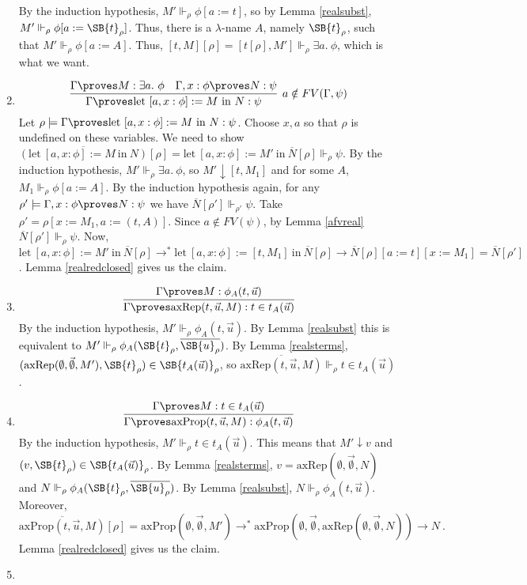 \documentclass{LMCS}
\newcommand{\ov}[1]{\ensuremath{\overline{#1}}}
\newcommand\reals{\ensuremath{\Vdash}}
\newcommand{\p}{\proves}
\newcommand{\g}{\Gamma}
\newcommand{\gp}{\Gamma \proves}
\newcommand{\rrho}{\reals_\rho}
\newcommand{\pl}[1]{\ensuremath{\mathrm{#1}}}
\newcommand{\LET}{\pl{let}}
\newcommand{\IN}{\pl{in}}
\newcommand{\sr}[1]{\ensuremath{\SB{#1}_\rho}}
\begin{document}
\begin{enumerate}[$\bullet$]
\[\]
By the induction hypothesis, $M' \reals_\rho \phi[a:=t]$, so by Lemma
\ref{realsubst}, $M' \reals_\rho \phi[a:=\SB{t}_\rho]$. Thus, there is a $\lambda$-name $A$, namely $\SB{t}_\rho$, such that $M' \reals_\rho \phi[a:=A]$. Thus,
$[t, M][\rho]=[t[\rho], M'] \reals_\rho \exists a.\ \phi$, which is what we want.
\item
\[
\infer[a \notin FV(\Gamma, \psi)]{\gp \LET\ [a, x : \phi] := M\ \IN\ N : \psi}
{\gp M : \exists a.\ \phi & \g, x : \phi \proves N : \psi}
\]
Let $\rho \models \gp \LET\ [a, x : \phi] := M\ \IN\ N : \psi$. Choose $x,
a$ so that $\rho$ is undefined on these variables. 
We need to
show $\ov{(\LET\ [a, x : \phi ] := M\ \IN\ N)}[\rho] = \LET\ [a, x : \phi] := M'\ \IN\ 
\ov{N}[\rho] \rrho \psi$.
By the induction hypothesis, $M' \rrho \exists a.\ \phi$, so $M' \downarrow [t, M_1]$ and
for some $A$, $M_1 \rrho \phi[a:=A]$. By the induction hypothesis again, for any $\rho' \models \g,
x : \phi \p N : \psi$ we have $\ov{N}[\rho'] \reals_{\rho'} \psi$. Take
$\rho' = \rho[x:=M_1, a:=(t, A)]$. Since $a \notin FV(\psi)$, by Lemma
\ref{afvreal} $\ov{N}[\rho'] \rrho \psi $. Now, $\LET\ [a, x : \phi] := M'\
\IN\ \ov{N}[\rho] \to^* \LET\ [a, x : \phi] :=
[t, M_1]\ \IN\ \ov{N}[\rho] \to \ov{N}[\rho][a:=t][x:=M_1] = \ov{N}[\rho']$.
Lemma \ref{realredclosed} gives us the claim.
\item 
\[
\infer{\gp \pl{axRep}(t, \vec{u}, M) : t \in t_A(\vec{u})}{\gp M : \phi_A(t, \vec{u})}
\]
By the induction hypothesis, $M' \reals_\rho \phi_A(t, \vec{u})$. By Lemma \ref{realsubst} 
this is equivalent to $M' \reals_\rho \phi_A(\SB{t}_\rho, \ov{\SB{u}_\rho})$.
By Lemma \ref{realsterms}, $(\pl{axRep}(\emptyset, \vec{\emptyset}, M'), \SB{t}_\rho) \in
\SB{t_A(\vec{u})}_\rho$, so $\ov{\pl{axRep}(t, \vec{u}, M)} \rrho t \in t_A(\vec{u})$. 
\item
\[
\infer{\gp \pl{axProp}(t, \vec{u}, M) : \phi_A(t, \vec{u}) }{ \gp M : t
\in t_A(\vec{u})}
\]
By the induction hypothesis, $M' \reals_\rho t \in t_A(\vec{u})$. This means that 
$M' \downarrow v$ and $(v, \SB{t}_\rho) \in \sr{t_A(\vec{u})}$. 
By Lemma \ref{realsterms}, $v = \pl{axRep}(\emptyset, \vec{\emptyset}, N)$ and $N \reals_\rho \phi_A(\SB{t}_\rho, \ov{\SB{u}_\rho})$.
By Lemma \ref{realsubst}, $N \reals_\rho \phi_A(t, \vec{u})$.
Moreover, 
\[\ov{\pl{axProp}(t, \vec{u}, M)}[\rho] = \pl{axProp}(\emptyset,
\vec{\emptyset}, M') \to^* \pl{axProp}(\emptyset, \vec{\emptyset}, \pl{axRep}(
\emptyset, \vec{\emptyset}, N)) \to N\ .\]
 Lemma \ref{realredclosed} gives us the claim.
\item

\end{enumerate}
\end{document}
